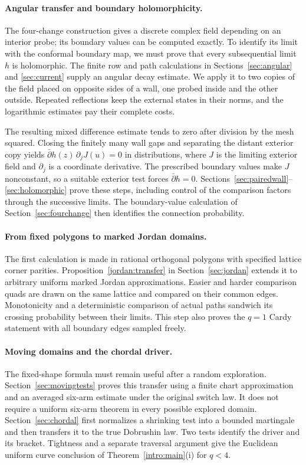 \paragraph{Angular transfer and boundary holomorphicity.}
The four-change construction gives a discrete complex field depending
on an interior probe; its boundary values can be computed exactly.
To identify its limit with the conformal boundary map, we must prove
that every subsequential limit $h$ is holomorphic.  The finite row and
path calculations in Sections~\ref{sec:angular} and \ref{sec:current}
supply an angular decay estimate.  We apply it to two copies of the
field placed on opposite sides of a wall, one probed inside and the
other outside.  Repeated reflections keep the external states in
their norms, and the logarithmic estimates pay their complete costs.

The resulting mixed difference estimate tends to zero after division
by the mesh squared.  Closing the finitely many wall gaps and separating
the distant exterior copy yields
$\bar\partial h(z)\,\partial_jJ(u)=0$ in distributions, where $J$ is
the limiting exterior field and $\partial_j$ is a coordinate derivative.
The prescribed boundary values make $J$ nonconstant, so a suitable
exterior test forces $\bar\partial h=0$.
Sections~\ref{sec:pairedwall}--\ref{sec:holomorphic} prove these steps,
including control of the comparison factors through the successive limits.
The boundary-value calculation of Section~\ref{sec:fourchange} then
identifies the connection probability.

\paragraph{From fixed polygons to marked Jordan domains.}
The first calculation is made in rational orthogonal polygons with
specified lattice corner parities.  Proposition~\ref{jordan:transfer}
in Section~\ref{sec:jordan} extends it to arbitrary uniform marked
Jordan approximations.  Easier and harder comparison quads are drawn
on the same lattice and compared on their common edges.  Monotonicity
and a deterministic
comparison of actual paths sandwich its crossing probability between
their limits.  This step also proves the $q=1$ Cardy statement with all
boundary edges sampled freely.

\paragraph{Moving domains and the chordal driver.}
The fixed-shape formula must remain useful after a random exploration.
Section~\ref{sec:movingtests} proves this transfer using a finite chart
approximation and an averaged six-arm estimate under the original
switch law.  It does not require a uniform six-arm theorem in every
possible explored domain.  Section~\ref{sec:chordal} first normalizes a
shrinking test into a bounded martingale and then transfers it to the
true Dobrushin law.  Two tests identify the driver and its bracket.
Tightness and a separate traversal argument give the Euclidean uniform
curve conclusion of Theorem~\ref{intro:main}(i) for $q<4$.

